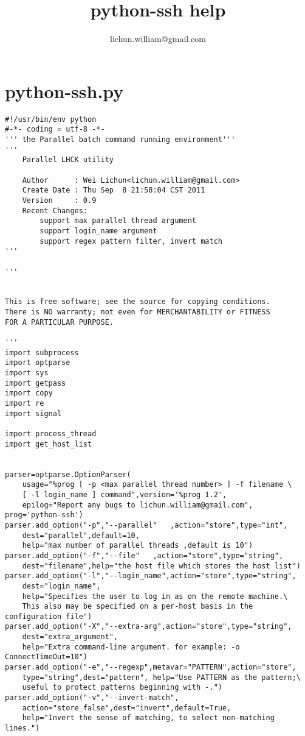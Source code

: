 \documentclass[a4paper,11pt]{article}
\title{python-ssh help}
\author{lichun.william@gmail.com}
\begin{document}
\maketitle
\tableofcontents
\newpage

\section{python-ssh.py}
\lstset{language=Python}
\begin{lstlisting}
#!/usr/bin/env python
#-*- coding = utf-8 -*-
''' the Parallel batch command running environment'''
'''
    Parallel LHCK utility
        
    Author      : Wei Lichun<lichun.william@gmail.com>
    Create Date : Thu Sep  8 21:58:04 CST 2011
    Version     : 0.9
    Recent Changes:
        support max parallel thread argument
        support login_name argument
        support regex pattern filter, invert match
'''

'''


This is free software; see the source for copying conditions. 
There is NO warranty; not even for MERCHANTABILITY or FITNESS
FOR A PARTICULAR PURPOSE.

'''
import subprocess
import optparse
import sys
import getpass
import copy
import re
import signal

import process_thread
import get_host_list


parser=optparse.OptionParser(
    usage="%prog [ -p <max parallel thread number> ] -f filename \
    [ -l login_name ] command",version='%prog 1.2',
    epilog="Report any bugs to lichun.william@gmail.com", prog='python-ssh')
parser.add_option("-p","--parallel"   ,action="store",type="int",
    dest="parallel",default=10,
    help="max number of parallel threads ,default is 10")
parser.add_option("-f","--file"   ,action="store",type="string",
    dest="filename",help="the host file which stores the host list")
parser.add_option("-l","--login_name",action="store",type="string",
    dest="login_name",
    help="Specifies the user to log in as on the remote machine.\
    This also may be specified on a per-host basis in the configuration file")
parser.add_option("-X","--extra-arg",action="store",type="string",
    dest="extra_argument",
    help="Extra command-line argument. for example: -o ConnectTimeOut=10")
parser.add_option("-e","--regexp",metavar="PATTERN",action="store",
    type="string",dest="pattern", help="Use PATTERN as the pattern;\
    useful to protect patterns beginning with -.")
parser.add_option("-v","--invert-match",
    action="store_false",dest="invert",default=True,
    help="Invert the sense of matching, to select non-matching lines.")



\end{lstlisting}
\end{document}
